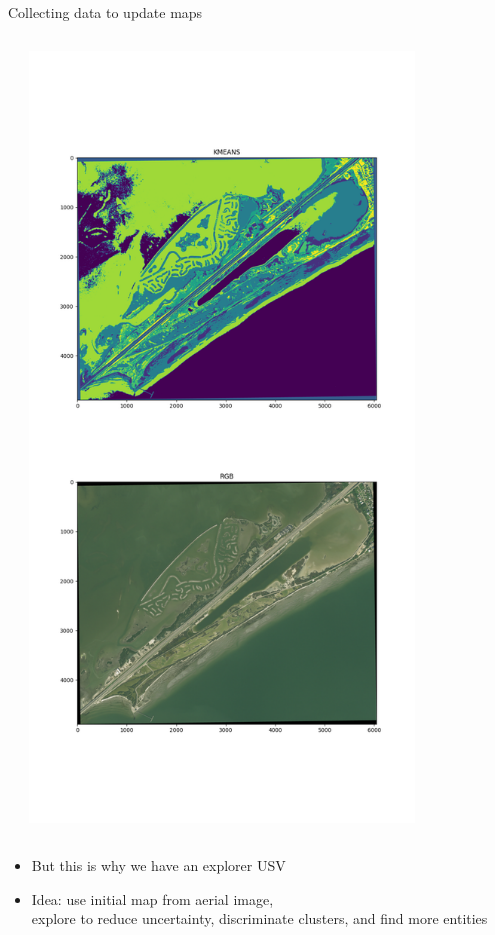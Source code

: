 \documentclass[9pt,xcolor=table]{beamer}
\begin{document}
\begin{frame}{Collecting data to update maps}
\begin{columns}
\begin{column}{0.5\textwidth}
        \end{column}    
        \begin{column}{0.5\textwidth}
        \includegraphics[width=0.8\textwidth,trim={4cm 30cm 4cm 12cm},clip]{img/clusters.png}
        \end{column}
    \end{columns}
    \begin{itemize}
        \item But this is why we have an explorer USV
        \item Idea: use initial map from aerial image, \\
        explore to reduce uncertainty, discriminate clusters, and find more entities

\end{itemize}
\end{frame}
\end{document}
